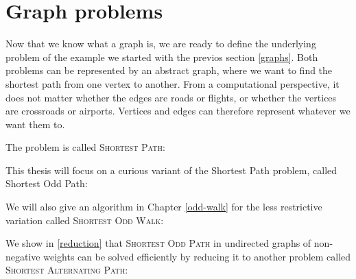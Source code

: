 \section{Graph problems}
\label{graph-problems}

Now that we know what a graph is, we are ready to define the underlying problem of the example we started with the previos section \ref{graphs}. Both problems can be represented by an abstract graph, where we want to find the shortest path from one vertex to another. From a computational perspective, it does not matter whether the edges are roads or flights, or whether the vertices are crossroads or airports. Vertices and edges can therefore represent whatever we want them to. 

The problem is called \textsc{Shortest Path}:


This thesis will focus on a curious variant of the Shortest Path problem, called Shortest Odd Path:


We will also give an algorithm in Chapter \ref{odd-walk} for the less restrictive variation called \textsc{Shortest Odd Walk}:


We show in \ref{reduction} that \textsc{Shortest Odd Path} in undirected graphs of non-negative weights can be solved efficiently by reducing it to another problem called \textsc{Shortest Alternating Path}:


